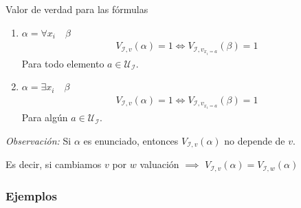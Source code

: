\begin{definicion}{Valor de verdad para las fórmulas}{}
\begin{enumerate}
    \item $\alpha = \forall x_i \quad \beta$
        \begin{gather*}
            V_{\mathcal{I}, v}(\alpha) = 1 \iff
            V_{\mathcal{I}, v_{x_i=a}}(\beta) = 1
        \end{gather*}
        Para todo elemento $a \in \mathcal{U}_{\mathcal{I}}$.
    \item $\alpha = \exists x_i \quad \beta$
        \begin{gather*}
            V_{\mathcal{I}, v}(\alpha) = 1 \iff
            V_{\mathcal{I}, v_{x_i=a}}(\beta) = 1
        \end{gather*}
        Para algún $a \in \mathcal{U}_{\mathcal{I}}$.
\end{enumerate}     
\end{definicion}

\bigskip
    \textit{Observación:}
    Si $\alpha$ es enunciado, entonces $V_{\mathcal{I}, v}(\alpha)$ no depende
    de $v$.

    Es decir, si cambiamos $v$ por $w$ valuación $\implies$ 
    $V_{\mathcal{I}, v}(\alpha) = V_{\mathcal{I}, w}(\alpha)$

    \subsubsection{Ejemplos}

